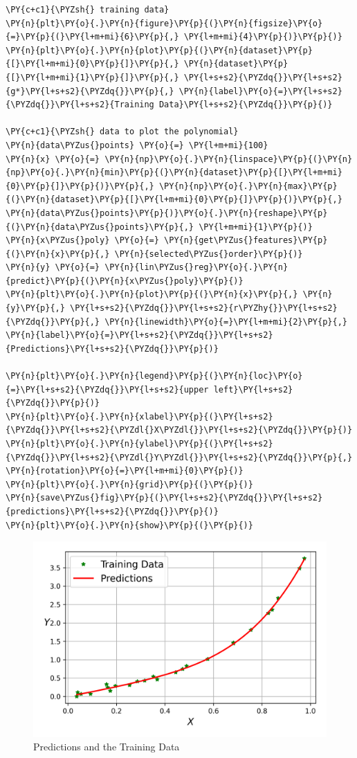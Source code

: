 \documentclass[a4paper,11pt]{article}%
\begin{document}
    \begin{tcolorbox}[breakable, size=fbox, boxrule=1pt, pad at break*=1mm,colback=cellbackground, colframe=cellborder]
\begin{Verbatim}[commandchars=\\\{\}]
\PY{c+c1}{\PYZsh{} training data}
\PY{n}{plt}\PY{o}{.}\PY{n}{figure}\PY{p}{(}\PY{n}{figsize}\PY{o}{=}\PY{p}{(}\PY{l+m+mi}{6}\PY{p}{,} \PY{l+m+mi}{4}\PY{p}{)}\PY{p}{)}
\PY{n}{plt}\PY{o}{.}\PY{n}{plot}\PY{p}{(}\PY{n}{dataset}\PY{p}{[}\PY{l+m+mi}{0}\PY{p}{]}\PY{p}{,} \PY{n}{dataset}\PY{p}{[}\PY{l+m+mi}{1}\PY{p}{]}\PY{p}{,} \PY{l+s+s2}{\PYZdq{}}\PY{l+s+s2}{g*}\PY{l+s+s2}{\PYZdq{}}\PY{p}{,} \PY{n}{label}\PY{o}{=}\PY{l+s+s2}{\PYZdq{}}\PY{l+s+s2}{Training Data}\PY{l+s+s2}{\PYZdq{}}\PY{p}{)}

\PY{c+c1}{\PYZsh{} data to plot the polynomial}
\PY{n}{data\PYZus{}points} \PY{o}{=} \PY{l+m+mi}{100}
\PY{n}{x} \PY{o}{=} \PY{n}{np}\PY{o}{.}\PY{n}{linspace}\PY{p}{(}\PY{n}{np}\PY{o}{.}\PY{n}{min}\PY{p}{(}\PY{n}{dataset}\PY{p}{[}\PY{l+m+mi}{0}\PY{p}{]}\PY{p}{)}\PY{p}{,} \PY{n}{np}\PY{o}{.}\PY{n}{max}\PY{p}{(}\PY{n}{dataset}\PY{p}{[}\PY{l+m+mi}{0}\PY{p}{]}\PY{p}{)}\PY{p}{,} \PY{n}{data\PYZus{}points}\PY{p}{)}\PY{o}{.}\PY{n}{reshape}\PY{p}{(}\PY{n}{data\PYZus{}points}\PY{p}{,} \PY{l+m+mi}{1}\PY{p}{)}
\PY{n}{x\PYZus{}poly} \PY{o}{=} \PY{n}{get\PYZus{}features}\PY{p}{(}\PY{n}{x}\PY{p}{,} \PY{n}{selected\PYZus{}order}\PY{p}{)}
\PY{n}{y} \PY{o}{=} \PY{n}{lin\PYZus{}reg}\PY{o}{.}\PY{n}{predict}\PY{p}{(}\PY{n}{x\PYZus{}poly}\PY{p}{)}
\PY{n}{plt}\PY{o}{.}\PY{n}{plot}\PY{p}{(}\PY{n}{x}\PY{p}{,} \PY{n}{y}\PY{p}{,} \PY{l+s+s2}{\PYZdq{}}\PY{l+s+s2}{r\PYZhy{}}\PY{l+s+s2}{\PYZdq{}}\PY{p}{,} \PY{n}{linewidth}\PY{o}{=}\PY{l+m+mi}{2}\PY{p}{,} \PY{n}{label}\PY{o}{=}\PY{l+s+s2}{\PYZdq{}}\PY{l+s+s2}{Predictions}\PY{l+s+s2}{\PYZdq{}}\PY{p}{)}

\PY{n}{plt}\PY{o}{.}\PY{n}{legend}\PY{p}{(}\PY{n}{loc}\PY{o}{=}\PY{l+s+s2}{\PYZdq{}}\PY{l+s+s2}{upper left}\PY{l+s+s2}{\PYZdq{}}\PY{p}{)}
\PY{n}{plt}\PY{o}{.}\PY{n}{xlabel}\PY{p}{(}\PY{l+s+s2}{\PYZdq{}}\PY{l+s+s2}{\PYZdl{}X\PYZdl{}}\PY{l+s+s2}{\PYZdq{}}\PY{p}{)}
\PY{n}{plt}\PY{o}{.}\PY{n}{ylabel}\PY{p}{(}\PY{l+s+s2}{\PYZdq{}}\PY{l+s+s2}{\PYZdl{}Y\PYZdl{}}\PY{l+s+s2}{\PYZdq{}}\PY{p}{,} \PY{n}{rotation}\PY{o}{=}\PY{l+m+mi}{0}\PY{p}{)}
\PY{n}{plt}\PY{o}{.}\PY{n}{grid}\PY{p}{(}\PY{p}{)}
\PY{n}{save\PYZus{}fig}\PY{p}{(}\PY{l+s+s2}{\PYZdq{}}\PY{l+s+s2}{predictions}\PY{l+s+s2}{\PYZdq{}}\PY{p}{)}
\PY{n}{plt}\PY{o}{.}\PY{n}{show}\PY{p}{(}\PY{p}{)}
\end{Verbatim}
\end{tcolorbox}

\begin{figure}[h]
	\centering
	\includegraphics[width=0.7\linewidth]{figures/predictions}
	\caption{Predictions and the Training Data}
\end{figure}
   
\end{document}
